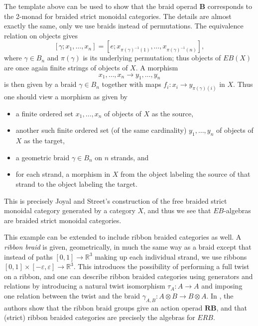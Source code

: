 \documentclass{amsbook} %
\newcommand{\mb}{\mathbf}
\numberwithin{section}{chapter}
\begin{document}
\begin{example}
The template above can be used to show that the braid operad $\mb{B}$ corresponds to the 2-monad for braided strict monoidal categories.  The details are almost exactly the same, only we use braids instead of permutations.  The equivalence relation on objects gives
\[
[\gamma; x_{1}, \ldots, x_{n}] = [e; x_{\pi(\gamma)^{-1}(1)}, \ldots, x_{\pi(\gamma)^{-1}(n)}],
\]
where $\gamma \in B_{n}$ and $\pi(\gamma)$ is its underlying permutation; thus objects of $EB(X)$ are once again finite strings of objects of $X$.  A morphism
\[
x_{1}, \ldots, x_{n} \rightarrow y_{1}, \ldots, y_{n}
\]
is then given by a braid $\gamma \in B_{n}$ together with maps $f_{i} \colon x_{i} \rightarrow y_{\pi(\gamma)(i)}$ in $X$.  Thus one should view a morphism as given by
\begin{itemize}
\item a finite ordered set $x_{1}, \ldots, x_{n}$ of objects of $X$ as the source,
\item another such finite ordered set (of the same cardinality) $y_{1}, \ldots, y_{n}$ of objects of $X$ as the target,
\item a geometric braid $\gamma \in B_{n}$ on $n$ strands, and
\item for each strand, a morphism in $X$ from the object labeling the source of that strand to the object labeling the target.
\end{itemize}
This is precisely Joyal and Street's \cite{js} construction of the free braided strict monoidal category generated by a category $X$, and thus we see that $EB$-algebras are braided strict monoidal categories.

This example can be extended to include ribbon braided categories as well.  A \textit{ribbon braid} is given, geometrically, in much the same way as a braid except that instead of paths $[0,1] \rightarrow \mathbb{R}^{3}$ making up each individual strand, we use ribbons
$[0,1] \times [-\varepsilon, \varepsilon] \rightarrow \mathbb{R}^{3}$.  This introduces the possibility of performing a full twist on a ribbon, and one can describe ribbon braided categories using generators and relations by introducing a natural twist isomorphism $\tau_{A} \colon A \rightarrow A$ and imposing one relation between the twist and the braid $\gamma_{A,B} \colon A \otimes B \rightarrow B \otimes A$.  In \cite{sal-wahl}, the authors show that the ribbon braid groups give an action operad $\mb{RB}$, and that (strict) ribbon braided categories are precisely the algebras for $ERB$.
\end{example}
\end{document}
